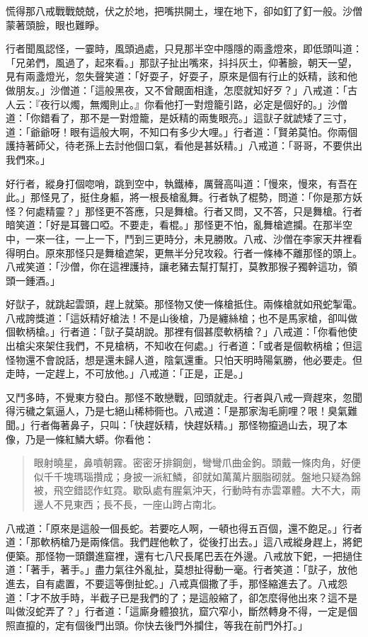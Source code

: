 慌得那八戒戰戰兢兢，伏之於地，把嘴拱開土，埋在地下，卻如釘了釘一般。沙僧蒙著頭臉，眼也難睜。

行者聞風認怪，一霎時，風頭過處，只見那半空中隱隱的兩盞燈來，即低頭叫道：「兄弟們，風過了，起來看。」那獃子扯出嘴來，抖抖灰土，仰著臉，朝天一望，見有兩盞燈光，忽失聲笑道：「好耍子，好耍子，原來是個有行止的妖精，該和他做朋友。」沙僧道：「這般黑夜，又不曾覿面相逢，怎麼就知好歹？」八戒道：「古人云：『夜行以燭，無燭則止。』你看他打一對燈籠引路，必定是個好的。」沙僧道：「你錯看了，那不是一對燈籠，是妖精的兩隻眼亮。」這獃子就諕矮了三寸，道：「爺爺呀！眼有這般大啊，不知口有多少大哩。」行者道：「賢弟莫怕。你兩個護持著師父，待老孫上去討他個口氣，看他是甚妖精。」八戒道：「哥哥，不要供出我們來。」

好行者，縱身打個唿哨，跳到空中，執鐵棒，厲聲高叫道：「慢來，慢來，有吾在此。」那怪見了，挺住身軀，將一根長槍亂舞。行者執了棍勢，問道：「你是那方妖怪？何處精靈？」那怪更不答應，只是舞槍。行者又問，又不答，只是舞槍。行者暗笑道：「好是耳聾口啞。不要走，看棍。」那怪更不怕，亂舞槍遮攔。在那半空中，一來一往，一上一下，鬥到三更時分，未見勝敗。八戒、沙僧在李家天井裡看得明白。原來那怪只是舞槍遮架，更無半分兒攻殺。行者一條棒不離那怪的頭上。八戒笑道：「沙僧，你在這裡護持，讓老豬去幫打幫打，莫教那猴子獨幹這功，領頭一鍾酒。」

好獃子，就跳起雲頭，趕上就築。那怪物又使一條槍抵住。兩條槍就如飛蛇掣電。八戒誇獎道：「這妖精好槍法！不是山後槍，乃是纏絲槍；也不是馬家槍，卻叫做個軟柄槍。」行者道：「獃子莫胡說。那裡有個甚麼軟柄槍？」八戒道：「你看他使出槍尖來架住我們，不見槍柄，不知收在何處。」行者道：「或者是個軟柄槍；但這怪物還不會說話，想是還未歸人道，陰氣還重。只怕天明時陽氣勝，他必要走。但走時，一定趕上，不可放他。」八戒道：「正是，正是。」

又鬥多時，不覺東方發白。那怪不敢戀戰，回頭就走。行者與八戒一齊趕來，忽聞得污穢之氣逼人，乃是七絕山稀柿衕也。八戒道：「是那家淘毛廁哩？哏！臭氣難聞。」行者侮著鼻子，只叫：「快趕妖精，快趕妖精。」那怪物攛過山去，現了本像，乃是一條紅鱗大蟒。你看他：
\begin{quote}
眼射曉星，鼻噴朝霧。密密牙排鋼劍，彎彎爪曲金鉤。頭戴一條肉角，好便似千千塊瑪瑙攢成；身披一派紅鱗，卻就如萬萬片胭脂砌就。盤地只疑為錦被，飛空錯認作虹霓。歇臥處有腥氣沖天，行動時有赤雲罩體。大不大，兩邊人不見東西；長不長，一座山跨占南北。
\end{quote}

八戒道：「原來是這般一個長蛇。若要吃人啊，一頓也得五百個，還不飽足。」行者道：「那軟柄槍乃是兩條信。我們趕他軟了，從後打出去。」這八戒縱身趕上，將鈀便築。那怪物一頭鑽進窟裡，還有七八尺長尾巴丟在外邊。八戒放下鈀，一把撾住道：「著手，著手。」盡力氣往外亂扯，莫想扯得動一毫。行者笑道：「獃子，放他進去，自有處置，不要這等倒扯蛇。」八戒真個撒了手，那怪縮進去了。八戒怨道：「才不放手時，半截子已是我們的了；是這般縮了，卻怎麼得他出來？這不是叫做沒蛇弄了？」行者道：「這廝身體狼犺，窟穴窄小，斷然轉身不得，一定是個照直攛的，定有個後門出頭。你快去後門外攔住，等我在前門外打。」

